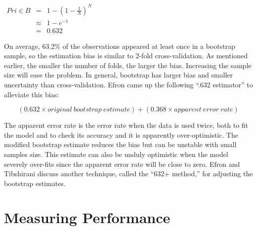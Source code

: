 \documentclass[12pt,]{krantz}
\theoremstyle{definition}
\theoremstyle{definition}
\theoremstyle{definition}
\theoremstyle{remark}
\begin{document}
\(\begin{array}{ccc} Pr{i\in B} & = & 1-\left(1-\frac{1}{N}\right)^{N}\\  & \approx & 1-e^{-1}\\  & = & 0.632 \end{array}\)

On average, 63.2\% of the observations appeared at least once in a
bootstrap sample, so the estimation bias is similar to 2-fold
cross-validation. As mentioned earlier, the smaller the number of folds,
the larger the bias. Increasing the sample size will ease the problem.
In general, bootstrap has larger bias and smaller uncertainty than
cross-validation. Efron came up the following ``.632 estimator'' to
alleviate this bias:

\[(0.632 × original\ bootstrap\ estimate) + (0.368 × apparent\ error\ rate)\]

The apparent error rate is the error rate when the data is used twice,
both to fit the model and to check its accuracy and it is apparently
over-optimistic. The modified bootstrap estimate reduces the bias but
can be unstable with small samples size. This estimate can also be
unduly optimistic when the model severely over-fits since the apparent
error rate will be close to zero. Efron and Tibshirani \citep{b632plus}
discuss another technique, called the ``632+ method,'' for adjusting the
bootstrap estimates.

\chapter{Measuring Performance}\label{measuring-performance}



\backmatter
\printindex
\end{document}
